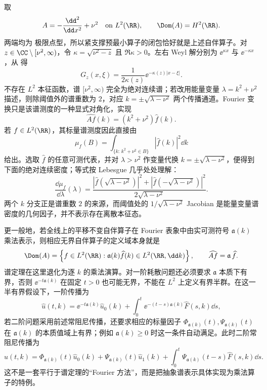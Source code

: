 \begin{exbox}\label{ex:math-sl-line-free-green}
取
\[
 A=-\frac{\dd^2}{\dd x^2}+\nu^2
 \quad\text{on }L^2(\RR),
 \qquad
 \Dom(A)=H^2(\RR).
\]
两端均为 极限点型，所以紧支撑预最小算子的闭包恰好就是上述自伴算子。对 $z\in\CC\setminus[\nu^2,\infty)$，令 $\kappa=\sqrt{\nu^2-z}$ 且 $\Re\kappa>0$。左右 Weyl 解分别为 $\ee^{\kappa x}$ 与 $\ee^{-\kappa x}$，从 得
\begin{equation*}G_z(x,\xi)=\frac{1}{2\kappa(z)}\ee^{-\kappa(z)|x-\xi|}.
\end{equation*}
不存在 $L^2$ 本征函数，谱 $[\nu^2,\infty)$ 完全为绝对连续谱；若改用能量变量 $\lambda=k^2+\nu^2$ 描述，则除阈值外的谱重数为 $2$，对应 $k=\pm\sqrt{\lambda-\nu^2}$ 两个传播通道。Fourier 变换只是该谱测度的一种显式对角化，实现
\[
 \widehat{Af}(k)=(k^2+\nu^2)\widehat f(k).
\]
若 $f\in L^2(\RR)$，其标量谱测度因此直接由
\[
 \mu_f(B)=\int_{\{k:\,k^2+\nu^2\in B\}}|\widehat f(k)|^2\dd k
\]
给出。选取 $\widehat f$ 的任意可测代表，并对 $\lambda>\nu^2$ 作变量代换 $k=\pm\sqrt{\lambda-\nu^2}$，便得到下面的绝对连续密度；等式按 Lebesgue 几乎处处理解：
\begin{equation*}\frac{\dd\mu_f}{\dd\lambda}(\lambda)
 =\frac{
 |\widehat f(\sqrt{\lambda-\nu^2})|^2+
 |\widehat f(-\sqrt{\lambda-\nu^2})|^2}
 {2\sqrt{\lambda-\nu^2}}.
\end{equation*}
两个 $k$ 分支正是谱重数 $2$ 的来源，而阈值处的 $1/\sqrt{\lambda-\nu^2}$ Jacobian 是能量变量谱密度的几何因子，并不表示存在离散本征态。
\end{exbox}

更一般地，若全线上的平移不变自伴算子在 Fourier 表象中由实可测符号 $\mathfrak a(k)$ 乘法表示，则相应无界自伴算子的定义域本身就是
\[
 \Dom(A)=\left\{f\in L^2(\RR):\mathfrak a(k)\widehat f(k)\in L^2(\RR,\dd k)\right\},
 \qquad
 \widehat{Af}=\mathfrak a\,\widehat f.
\]
谱定理在这里退化为逐 $k$ 的乘法演算。对一阶耗散问题还必须要求 $\mathfrak a$ 本质下有界，否则 $\ee^{-t\mathfrak a(k)}$ 在固定 $t>0$ 也可能无界，不能在 $L^2$ 上定义有界半群。在这一半有界假设下，一阶传播为
\begin{equation*}\widehat u(t,k)=\ee^{-t\mathfrak a(k)}\widehat u_0(k)
 +\int_0^t\ee^{-(t-s)\mathfrak a(k)}\widehat F(s,k)\dd s,
\end{equation*}
若二阶问题采用前述常阻尼传播，还要求相应的标量因子 $\Phi_{\mathfrak a(k)}(t),\Psi_{\mathfrak a(k)}(t)$ 在 $\mathfrak a(k)$ 的本质值域上有界；例如 $\mathfrak a(k)\ge0$ 时这一条件自动满足。此时二阶常阻尼传播为
\begin{equation*}\widehat u(t,k)=\Phi_{\mathfrak a(k)}(t)\widehat u_0(k)
 +\Psi_{\mathfrak a(k)}(t)\widehat u_1(k)
 +\int_0^t\Psi_{\mathfrak a(k)}(t-s)\widehat F(s,k)\dd s.
\end{equation*}
这不是一套平行于谱定理的“Fourier 方法”，而是把抽象谱表示具体实现为乘法算子的特例。

